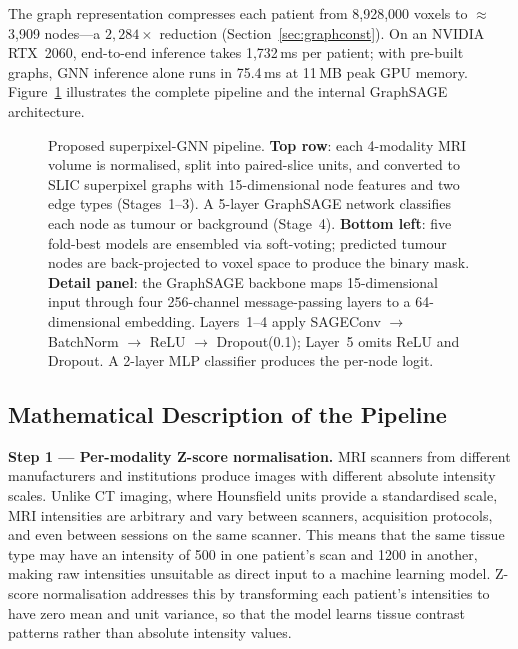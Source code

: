 \documentclass{article}
\begin{document}
The graph representation compresses each patient from 8,928,000 voxels to
$\approx$3,909 nodes---a $2{,}284\times$ reduction
(Section~\ref{sec:graphconst}). On an NVIDIA RTX~2060, end-to-end inference
takes 1,732\,ms per patient; with pre-built graphs, GNN inference alone
runs in 75.4\,ms at 11\,MB peak GPU memory.
Figure~\ref{fig:proposed_model} illustrates the complete pipeline and the
internal GraphSAGE architecture.

\begin{figure}[H]
\centering
\caption{Proposed superpixel-GNN pipeline.
\textbf{Top row}: each 4-modality MRI volume is normalised, split into
paired-slice units, and converted to SLIC superpixel graphs with
15-dimensional node features and two edge types (Stages~1--3). A 5-layer
GraphSAGE network classifies each node as tumour or background (Stage~4).
\textbf{Bottom left}: five fold-best models are ensembled via soft-voting;
predicted tumour nodes are back-projected to voxel space to produce the
binary mask.
\textbf{Detail panel}: the GraphSAGE backbone maps 15-dimensional input
through four 256-channel message-passing layers to a 64-dimensional
embedding. Layers~1--4 apply SAGEConv $\to$ BatchNorm $\to$ ReLU $\to$
Dropout(0.1); Layer~5 omits ReLU and Dropout. A 2-layer MLP classifier
produces the per-node logit.}
\label{fig:proposed_model}
\end{figure}

\subsection{Mathematical Description of the Pipeline}
\label{sec:mathpipeline}

\textbf{Step 1 --- Per-modality Z-score normalisation.}
MRI scanners from different manufacturers and institutions produce images with
different absolute intensity scales. Unlike CT imaging, where Hounsfield units
provide a standardised scale, MRI intensities are arbitrary and vary between
scanners, acquisition protocols, and even between sessions on the same scanner.
This means that the same tissue type may have an intensity of 500 in one patient's
scan and 1200 in another, making raw intensities unsuitable as direct input to a
machine learning model. Z-score normalisation addresses this by transforming each
patient's intensities to have zero mean and unit variance, so that the model
learns tissue contrast patterns rather than absolute intensity values.
\end{document}
